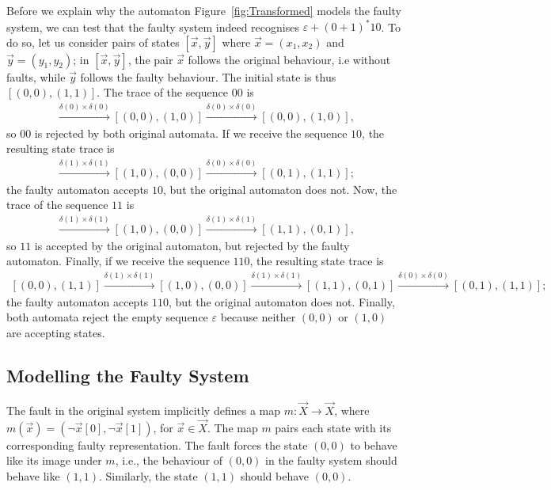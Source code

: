 Before we explain why the automaton Figure~\ref{fig:Transformed} models the faulty system, we can test that the faulty system indeed recognises $\varepsilon+(0+1)^*10$. %
To do so, let us consider pairs of states $[\vec{x},\vec{y}]$ where $\vec{x}=(x_1,x_2)$ and $\vec{y}=(y_1,y_2)$; 
 in $[\vec{x},\vec{y}]$, the pair $\vec{x}$ follows the original behaviour, i.e without faults, while $\vec{y}$ follows the faulty behaviour. 
The initial state is thus $[(0,0),(1,1)]$. 
The trace of the sequence $00$ is 
\begin{align*}
   [(0,0),(1,1)]\xrightarrow{\delta(0)\times\delta(0)}[(0,0),(1,0)]\xrightarrow{\delta(0)\times\delta(0)}[(0,0),(1,0)],
\end{align*}
so $00$ is rejected by both original automata. 
If we receive the sequence $10$, the resulting state trace is 
\begin{align*}
    [(0,0),(1,1)]\xrightarrow{\delta(1)\times\delta(1)}[(1,0),(0,0)]\xrightarrow{\delta(0)\times\delta(0)}[(0,1),(1,1)];
\end{align*}
the faulty automaton accepts $10$, but the original automaton does not. 
Now, the trace of the sequence $11$ is 
\begin{align*}
   [(0,0),(1,1)]\xrightarrow{\delta(1)\times\delta(1)}[(1,0),(0,0)]\xrightarrow{\delta(1)\times\delta(1)}[(1,1),(0,1)],
\end{align*}
so $11$ is accepted by the original automaton, but rejected by the faulty automaton. Finally, if we receive the sequence $110$, the resulting state trace is 
\begin{align*}
    [(0,0),(1,1)]\xrightarrow{\delta(1)\times\delta(1)}[(1,0),(0,0)]\xrightarrow{\delta(1)\times\delta(1)}[(1,1),(0,1)]\xrightarrow{\delta(0)\times\delta(0)}[(0,1),(1,1)];
\end{align*}
the faulty automaton accepts $110$, but the original automaton does not. Finally, both automata reject the empty sequence $\varepsilon$ because neither $(0,0)$ or $(1,0)$ are accepting states.

\subsection{Modelling the Faulty System}
The fault in the original system implicitly defines a map $m\colon \vec{X}\rightarrow\vec{X}$, where $m(\vec{x})=(\lnot \vec{x}[0],\lnot \vec{x}[1])$, for $\vec{x}\in \vec{X}$. The map $m$ pairs each state with its corresponding faulty representation. %
The fault forces the state $(0,0)$ to behave like its image under $m$, i.e., the behaviour of $(0,0)$ in the faulty system should behave like $(1,1)$. Similarly, the state $(1,1)$ should behave $(0,0)$. 

